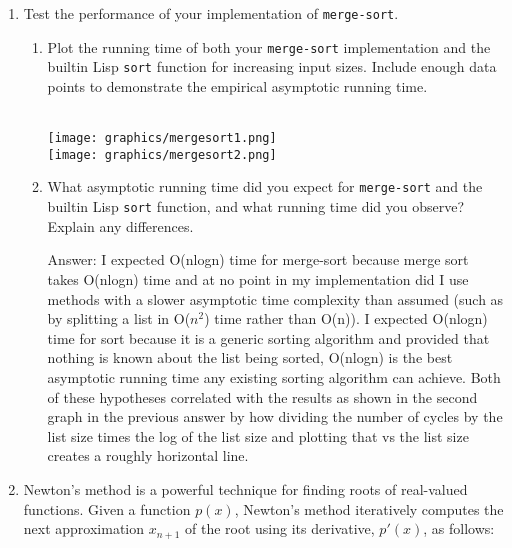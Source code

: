 \documentclass[12pt,letterpaper]{ntdhw}
\begin{document}
\begin{enumerate}
\begin{enumerate}
  \end{enumerate}

  \item Test the performance of your implementation of
    \texttt{merge-sort}.
    \begin{enumerate}

    \item Plot the running time of both your \texttt{merge-sort}
      implementation and the builtin Lisp \texttt{sort} function for
      increasing input sizes.  Include enough data points to
      demonstrate the empirical asymptotic running time.

    \begin{emph}
      \\
      \texttt{[image: graphics/mergesort1.png]} 
      \\
      \texttt{[image: graphics/mergesort2.png]}
    \end{emph}

  \item What asymptotic running time did you expect for
    \texttt{merge-sort} and the builtin Lisp \texttt{sort} function, and
    what running time did you observe?  Explain any differences.

    \begin{emph}
      Answer: I expected O(nlogn) time for merge-sort because merge sort takes O(nlogn) time and at no point in my implementation did I use methods with a slower asymptotic time complexity than assumed (such as by splitting a list in O($n^2$) time rather than O(n)). I expected O(nlogn) time for sort because it is a generic sorting algorithm and provided that nothing is known about the list being sorted, O(nlogn) is the best asymptotic running time any existing sorting algorithm can achieve. Both of these hypotheses correlated with the results as shown in the second graph in the previous answer by how dividing the number of cycles by the list size times the log of the list size and plotting that vs the list size creates a roughly horizontal line.
    \end{emph}

    \end{enumerate}

  \item Newton's method is a powerful technique for finding roots of real-valued functions. Given a function \( p(x) \), Newton's method iteratively computes the next approximation \( x_{n+1} \) of the root using its derivative, \( p'(x) \), as follows:


\end{enumerate}
\end{document}
